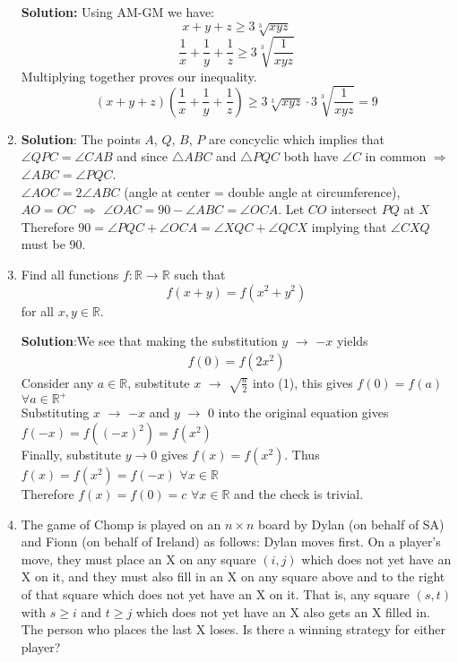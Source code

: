 \documentclass{article}
\begin{document}
\begin{enumerate}[itemsep=24pt]
\textbf{Solution:} 
Using AM-GM we have:
$$x+y+z \geq 3\sqrt[3]{xyz}$$
$$\frac{1}{x}+\frac{1}{y}+\frac{1}{z} \geq 3\sqrt[3]{\frac{1}{xyz}}$$
Multiplying together proves our inequality.
$$(x+y+z)(\frac{1}{x}+\frac{1}{y}+\frac{1}{z}) \geq 3\sqrt[3]{xyz}\cdot 3\sqrt[3]{\frac{1}{xyz}} = 9$$

\item 
\textbf{Solution}:
The points $A$, $Q$, $B$, $P$ are concyclic which implies that $\angle{QPC} = \angle{CAB}$ and since $\triangle{ABC}$ and $\triangle{PQC}$ both have $\angle{C}$ in common $\Rightarrow$ $\angle{ABC}=\angle{PQC}$.
\\$\angle{AOC} = 2\angle{ABC}$ (angle at center = double angle at circumference), $AO = OC$ $\Rightarrow$ $\angle{OAC} = 90 - \angle{ABC} = \angle{OCA}$. Let $CO$ intersect $PQ$ at $X$
\\Therefore $90 = \angle{PQC} + \angle{OCA} = \angle{XQC} + \angle{QCX}$ implying that $\angle{CXQ}$ must be 90.

\item
Find all functions $f : \mathbb{R} \to \mathbb{R}$ such that \[ f(x+y) = f(x^2+y^2) \] for all $x,y \in \mathbb{R}$.

\textbf{Solution}:We see that making the substitution $y$ $\rightarrow$ $-x$ yields 
\begin{align}
    f(0)=f(2x^{2})
\end{align}
Consider any $a \in \mathbb{R}$, substitute $x$ $\rightarrow$ $\sqrt{\frac{a}{2}}$ into (1), this gives $f(0) = f(a)$ $\forall a \in \mathbb{R^{+}}$
\\Substituting $x$ $\rightarrow$ $-x$ and $y$ $\rightarrow$ $0$ into the original equation gives $f(-x) = f((-x)^{2}) = f(x^{2})$
\\Finally, substitute $y \rightarrow 0$ gives $f(x) = f(x^{2})$. Thus $f(x)= f(x^{2}) = f(-x)$ $\forall x \in \mathbb{R}$
\\Therefore $f(x) = f(0) = c$ $\forall x \in \mathbb{R}$ and the check is trivial.

\item %
The game of Chomp is played on an $n \times n$ board by Dylan (on behalf of SA) and Fionn (on behalf of Ireland) as follows: Dylan moves first.
On a player's move, they must place an X on any square $(i, j)$ which does not yet have an X on it, and they must also fill in an X on any square above and to the right of that square which does not yet have an X on it.
That is, any square $(s, t)$ with $s \geq i$ and $t \geq j$ which does not yet have an X also gets an X filled in.
The person who places the last X loses.
Is there a winning strategy for either player?


\end{enumerate}
\end{document}
